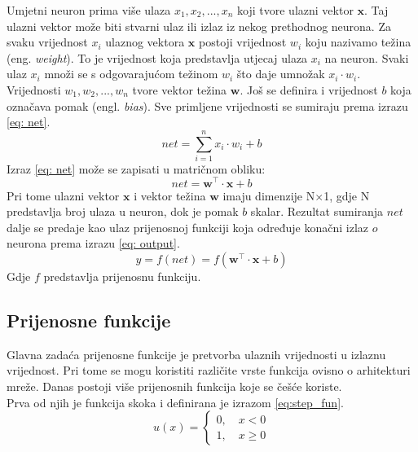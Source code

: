 \documentclass[times, utf8, zavrsni, numeric]{fer}
\renewcommand{\vec}[1]{\mathbf{#1}}
\begin{document}
Umjetni neuron prima više ulaza $x_1, x_2,...,x_n$ koji tvore ulazni 
vektor $\vec{x}$. Taj ulazni vektor može biti stvarni ulaz ili izlaz iz nekog 
prethodnog neurona. Za svaku vrijednost $x_i$ ulaznog vektora $\vec{x}$
postoji vrijednost $w_i$ koju nazivamo težina (eng. \textit{weight}). To je 
vrijednost koja predstavlja utjecaj ulaza $x_i$ na neuron. Svaki ulaz $x_i$ 
množi se s odgovarajućom težinom $w_i$ što daje umnožak $x_i \cdot w_i$. 
Vrijednosti $w_1, w_2,...,w_n$ tvore vektor težina $\vec{w}$. Još se definira
i vrijednost $b$ koja označava pomak (engl. \textit{bias}). Sve primljene 
vrijednosti se sumiraju prema izrazu \ref{eq: net}.
\begin{equation}
	net = \sum_{i=1}^{n}x_i \cdot w_i + b
	\label{eq: net}
\end{equation}
Izraz \ref{eq: net} može se zapisati u matričnom obliku:
\begin{equation}
	net = \vec{w}^\top \cdot \vec{x} + b
\end{equation}
Pri tome ulazni vektor $\vec{x}$ i vektor težina $\vec{w}$ imaju dimenzije 
N$\times$1, gdje N predstavlja broj ulaza u neuron, dok je pomak $b$ skalar.
Rezultat sumiranja $net$ dalje se predaje kao ulaz prijenosnoj funkciji koja
određuje konačni izlaz $o$ neurona prema izrazu \ref{eq: output}.
\begin{equation}
	y = f(net) = f(\vec{w}^\top \cdot \vec{x} + b)
	\label{eq: output}
\end{equation}
Gdje $f$ predstavlja prijenosnu funkciju.

\subsection{Prijenosne funkcije}
Glavna zadaća prijenosne funkcije je pretvorba ulaznih vrijednosti u izlaznu 
vrijednost. Pri tome se mogu koristiti različite vrste funkcija ovisno o 
arhitekturi mreže. Danas postoji više prijenosnih funkcija koje se češće koriste.
\\\indent
Prva od njih je funkcija skoka i definirana je izrazom \ref{eq:step_fun}.
\begin{equation}
	u(x) = 
	\begin{cases}
		0, \quad x < 0\\
		1, \quad x \geq 0
	\end{cases}
	\label{eq:step_fun}
\end{equation}
\end{document}
